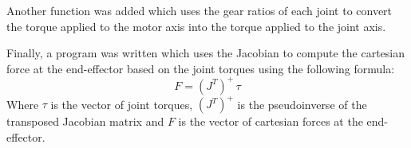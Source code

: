 Another function was added which uses the gear ratios of each joint to convert the torque applied to the motor axis into the torque applied to the joint axis.

Finally, a program was written which uses the Jacobian to compute the cartesian force at the end-effector based on
the joint torques using the following formula\parencite{lynchModernRoboticsMechanics2017}:
\begin{equation}
    F = (J^T)^+\,\tau
\end{equation}
Where $\tau$ is the vector of joint torques, $(J^T)^+$ is the pseudoinverse of the transposed Jacobian matrix and $F$ is the vector of cartesian forces at the end-effector.

